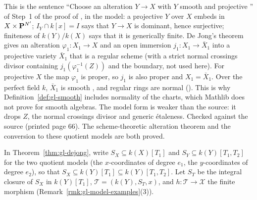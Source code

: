 \begin{remark}\label{rmk:gl-dejong}
This is the sentence ``Choose an alteration $Y\to X$ with $Y$ smooth and projective \cite[Theorem~4.1]{deJong}'' of Step~1 of the proof of
\cite[Theorem~6.1]{FHX}, in the model: a projective $Y$ over $X$ embeds in $X\times\mathbf{P}^{N'}$; $I_Y\cap k[x]=I$ says that $Y\to X$ is dominant, hence
surjective; finiteness of $k(Y)/k(X)$ says that it is generically finite. De Jong's theorem \cite[Theorem~4.1]{deJong} gives an alteration $\varphi_1\colon X_1\to X$
and an open immersion $j_1\colon X_1\to\bar X_1$ into a projective variety $\bar X_1$ that is a regular scheme (with a strict normal crossings divisor
containing $j_1(\varphi_1^{-1}(Z))$ and the boundary, not used here). For projective $X$ the map $\varphi_1$ is proper, so $j_1$ is also proper and
$X_1=\bar X_1$. Over the perfect field $k$, $\bar X_1$ is smooth \cite[Remark~4.2, 2.10]{deJong}, and regular rings are normal
(\cite[Tag~0567]{Stacks}). This is why Definition~\ref{def:gl-smooth} includes normality of the charts, which Mathlib does not prove for smooth algebras.
The model form is weaker than the source: it drops $Z$, the normal crossings divisor and generic \'etaleness. Checked against the source
(printed page 66). The scheme-theoretic alteration theorem and the conversion to these quotient models are both proved.
\end{remark}

\begin{definition}\label{def:gl-stein}
\leanok
{}
In Theorem~\ref{thm:gl-dejong}, write $S_X\subseteq k(X)[T_1]$ and $S_Y\subseteq k(Y)[T_1,T_2]$ for the two quotient models (the $x$-coordinates of degree $e_1$,
the $y$-coordinates of degree $e_2$), so that $S_X\subseteq k(Y)[T_1]\subseteq k(Y)[T_1,T_2]$. Let $S_T$ be the integral closure of $S_X$ in $k(Y)[T_1]$,
$\mathcal T=(k(Y),S_T,x)$, and $h\colon\mathcal T\to\mathcal X$ the finite morphism (Remark~\ref{rmk:gl-model-examples}(3)).
\end{definition}

